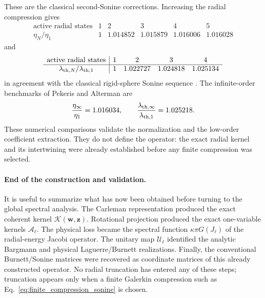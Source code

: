 \documentclass[11pt]{article}
\numberwithin{equation}{section}
\theoremstyle{definition}
\begin{document}
These are the classical second-Sonine corrections.  Increasing the radial
compression gives
\begin{equation}
\begin{array}{c|ccccc}
\text{active radial states} &1&2&3&4&5\\ \hline
\eta_N/\eta_1
&1&1.014852&1.015879&1.016006&1.016028
\end{array}
\label{eq:eta_sequence}
\end{equation}
and
\begin{equation}
\begin{array}{c|cccc}
\text{active radial states} &1&2&3&4\\ \hline
\lambda_{{\rm th},N}/\lambda_{{\rm th},1}
&1&1.022727&1.024818&1.025134
\end{array}
\label{eq:lambda_sequence}
\end{equation}
in agreement with the classical rigid-sphere Sonine sequence
\cite{ReineckeKremer1990,HiemstraEtAl2026}.  The infinite-order benchmarks of
Pekeris and Alterman \cite{PekerisAlterman1957} are
\begin{equation}
 \frac{\eta_\infty}{\eta_1}=1.016034,
 \qquad
 \frac{\lambda_{{\rm th},\infty}}{\lambda_{{\rm th},1}}=1.025218.
 \label{eq:transport_infinite_benchmarks}
\end{equation}
These numerical comparisons validate the normalization and the low-order
coefficient extraction.  They do not define the operator: the exact radial
kernel and its intertwining were already established before any finite
compression was selected.

\paragraph{End of the construction and validation.}
It is useful to summarize what has now been obtained before turning to the
global spectral analysis.  The Carleman representation produced the exact coherent
kernel $\mathcal K(\bm w,\bm z)$.  Rotational projection produced the exact
one-variable kernels $\mathscr A_\ell$.  The physical loss became the spectral
function $\kappa\pi G(J_\ell)$ of the radial-energy Jacobi operator.  The
unitary map $\mathcal U_\ell$ identified the analytic Bargmann and physical
Laguerre/Burnett realizations.  Finally, the conventional Burnett/Sonine
matrices were recovered as coordinate matrices of this already constructed
operator.  No radial truncation has entered any of these steps; truncation
appears only when a finite Galerkin compression such as
Eq.~\eqref{eq:finite_compression_sonine} is chosen.
\end{document}
